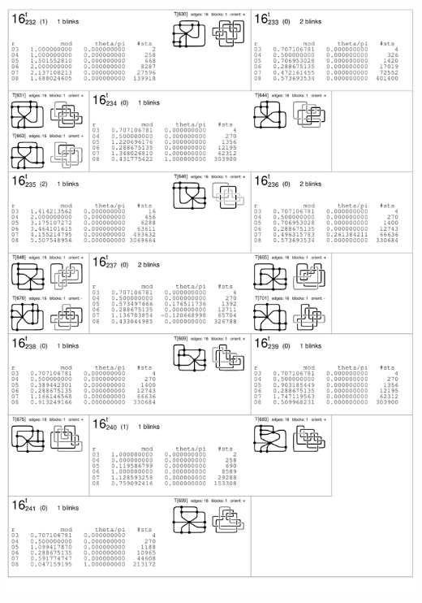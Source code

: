 \begin{center}
 \includegraphics[height=23.5cm]{E.figsbw2/con3catalog038_bw.pdf} \eject  

\end{center}
